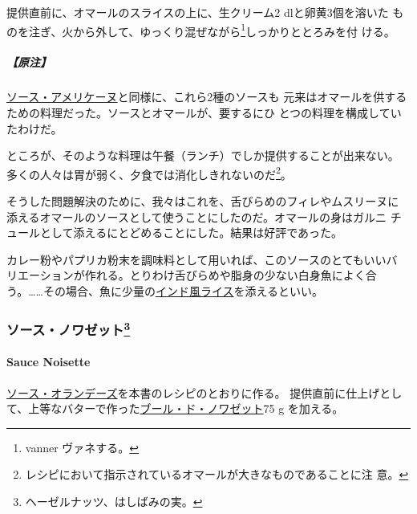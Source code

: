 \begin{recette}
提供直前に、オマールのスライスの上に、生クリーム2 dlと卵黄3個を溶いた
ものを注ぎ、火から外して、ゆっくり混ぜながら\footnote{vanner
  ヴァネする。}しっかりととろみを付 ける。

\hypertarget{ux539fux6ce8-15}{%
\subparagraph{【原注】}\label{ux539fux6ce8-15}}

\protect\hyperlink{sauce-americaine}{ソース・アメリケーヌ}と同様に、これら2種のソースも
元来はオマールを供するための料理だった。ソースとオマールが、要するにひ
とつの料理を構成していたわけだ。

ところが、そのような料理は午餐（ランチ）でしか提供することが出来ない。
多くの人々は胃が弱く、夕食では消化しきれないのだ\footnote{レシピにおいて指示されているオマールが大きなものであることに注
  意。}。

そうした問題解決のために、我々はこれを、舌びらめのフィレやムスリーヌに
添えるオマールのソースとして使うことにしたのだ。オマールの身はガルニ
チュールとして添えるにとどめることにした。結果は好評であった。

カレー粉やパプリカ粉末を調味料として用いれば、このソースのとてもいいバ
リエーションが作れる。とりわけ舌びらめや脂身の少ない白身魚によく合
う。\ldots{}\ldots{}その場合、魚に少量の\protect\hyperlink{riz-a-l-indienne}{インド風ライス}を添えるといい。

\maeaki

\hypertarget{ux30bdux30fcux30b9ux30ceux30efux30bcux30c3ux30c8102}{%
\subsubsection[ソース・ノワゼット]{\texorpdfstring{ソース・ノワゼット\footnote{ヘーゼルナッツ、はしばみの実。}}{ソース・ノワゼット}}\label{ux30bdux30fcux30b9ux30ceux30efux30bcux30c3ux30c8102}}

\hypertarget{sauce-noisette}{%
\paragraph{Sauce Noisette}\label{sauce-noisette}}


\protect\hyperlink{sauce-hollandaise}{ソース・オランデーズ}を本書のレシピのとおりに作る。
提供直前に仕上げとして、上等なバターで作った\protect\hyperlink{}{ブール・ド・ノワゼット}75
g を加える。


\end{recette}
